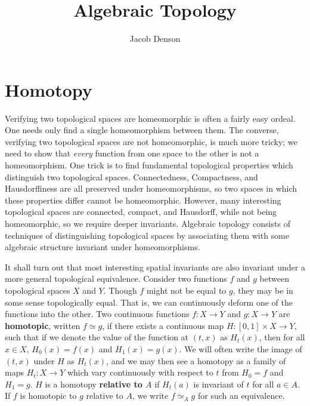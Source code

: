 

\DeclareMathOperator{\Dom}{Dom}

\title{Algebraic Topology}
\author{Jacob Denson}




\maketitle

\tableofcontents


\chapter{Homotopy}

Verifying two topological spaces are homeomorphic is often a fairly easy ordeal. One needs only find a single homeomorphism between them. The converse, verifying two topological spaces are not homeomorphic, is much more tricky; we need to show that {\it every} function from one space to the other is not a homeomorphism. One trick is to find fundamental topological properties which distinguish two topological spaces. Connectedness, Compactness, and Hausdorffiness are all preserved under homeomorphisms, so two spaces in which these properties differ cannot be homeomorphic. However, many interesting topological spaces are connected, compact, and Hausdorff, while not being homeomorphic, so we require deeper invariants. Algebraic topology consists of techniques of distinguishing topological spaces by associating them with some algebraic structure invariant under homeomorphisms.

It shall turn out that most interesting spatial invariants are also invariant under a more general topological equivalence. Consider two functions $f$ and $g$ between topological spaces $X$ and $Y$. Though $f$ might not be equal to $g$, they may be in some sense topologically equal. That is, we can continuously deform one of the functions into the other. Two continuous functions $f: X \to Y$ and $g:X \to Y$ are {\bf homotopic}, written $f \simeq g$, if there exists a continuous map $H: [0,1] \times X \to Y$, such that if we denote the value of the function at $(t,x)$ as $H_t(x)$, then for all $x \in X$, $H_0(x) = f(x)$ and $H_1(x) = g(x)$. We will often write the image of $(t,x)$ under $H$ as $H_t(x)$, and we may then see a homotopy as a family of maps $H_t: X \to Y$ which vary continuously with respect to $t$ from $H_0 = f$ and $H_1 = g$. $H$ is a homotopy {\bf relative to $A$} if $H_t(a)$ is invariant of $t$ for all $a \in A$. If $f$ is homotopic to $g$ relative to $A$, we write $f \simeq_A g$ for such an equivalence.

